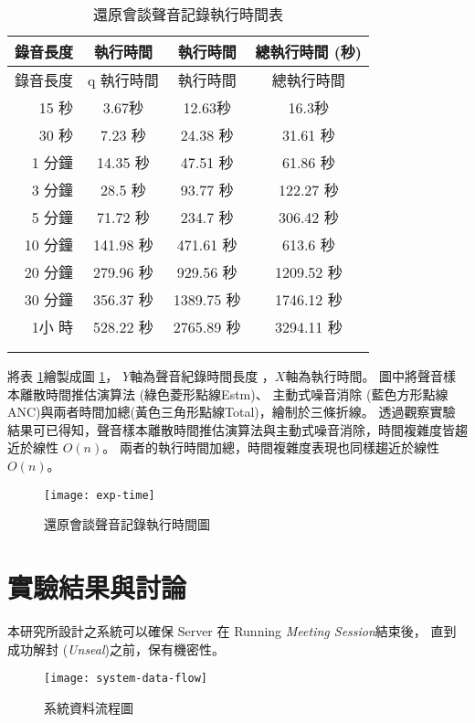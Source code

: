 \begin{longtable}{| r | c | c | c |}
    \hline
    錄音長度 &
    \DEFfuncEstm{} 執行時間 & \DEFfuncAnc{} 執行時間 & 總執行時間 (秒) \\
    \hline
    \endfirsthead

    錄音長度 &q
    \DEFfuncEstm{} 執行時間 & \DEFfuncAnc{} 執行時間 & 總執行時間 \\
    \hline
    \endhead

    15 秒 & 3.67秒 & 12.63秒 & 16.3秒 \\

    30 秒 & 7.23 秒 & 24.38 秒 & 31.61 秒 \\

    1 分鐘 & 14.35 秒 & 47.51 秒 & 61.86 秒 \\

    3 分鐘 & 28.5 秒 & 93.77 秒 & 122.27 秒 \\

    5 分鐘 & 71.72 秒 & 234.7 秒 & 306.42 秒 \\

    10 分鐘 & 141.98 秒 & 471.61 秒 & 613.6 秒 \\

    20 分鐘 & 279.96 秒 & 929.56 秒 & 1209.52 秒 \\

    30 分鐘 & 356.37 秒 & 1389.75 秒 & 1746.12 秒 \\

    1小 時 & 528.22 秒 & 2765.89 秒 & 3294.11 秒 \\

    \hline
    \caption{還原會談聲音記錄執行時間表}\label{table:exp-time} \\
    \endlastfoot
\end{longtable}

    將表 \ref{table:exp-time}繪製成圖 \ref{fig:exp-time}，
$Y$軸為聲音紀錄時間長度 \DEFtimeREC，$X$軸為執行時間。
圖中將聲音樣本離散時間推估演算法 \DEFfuncEstm{} (綠色菱形點線Estm)、
主動式噪音消除 \DEFfuncAnc{}(藍色方形點線ANC)與兩者時間加總(黃色三角形點線Total)，繪制於三條折線。
透過觀察實驗結果可已得知，聲音樣本離散時間推估演算法與主動式噪音消除，時間複雜度皆趨近於線性 $O(n)$。
兩者的執行時間加總，時間複雜度表現也同樣趨近於線性 $O(n)$。

\begin{figure}[H]
    \centering
    \texttt{[image: exp-time]}
    \caption{還原會談聲音記錄執行時間圖}\label{fig:exp-time}
\end{figure}


\section{實驗結果與討論}

    本研究所設計之系統可以確保 Server 在 Running {\it Meeting Session}結束後，
直到成功解封 ({\it Unseal})之前，\DEFrecREV 保有機密性。

\begin{figure}[H]
    \centering
    \texttt{[image: system-data-flow]}
    \caption{系統資料流程圖}\label{fig:system-data-flow}
\end{figure}